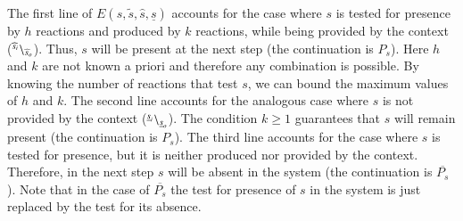 The first line of $ E(s,\widetilde{s},\widehat{s},\underline{s})$ accounts for the case where $s$ is tested for presence by $h$ reactions and produced by $k$ reactions, while being provided by the context (${}^{\widehat{s}_i} \backslash_{\widehat{s}_o}$).
Thus, $s$ will be present at the next step (the continuation is $P_s$). Here $h$ and $k$ are not known a priori and therefore any
combination is possible. By knowing the number of reactions that test $s$, we can bound the maximum 
values of $h$ and $k$.
The second line accounts for the analogous case where $s$ is not provided by the context (${}^{\underline{s}_i} \backslash_{\underline{s}_o}$). 
The condition $k\geq 1$ guarantees that $s$ will remain present (the continuation is $P_s$).
The third line accounts for the case where $s$ is tested for presence, but it is neither produced nor provided by  the context. Therefore, in the next step $s$ will be absent in the system (the continuation is $\overline{P_s}$).
Note that in the case of $\overline{P_s}$ the test for presence of $s$ in the system is just replaced by the test for its absence.


